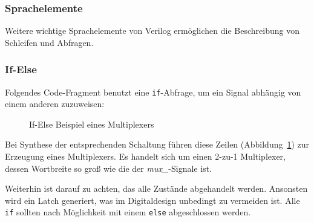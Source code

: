 \subsubsection{Sprachelemente}
Weitere wichtige Sprachelemente von Verilog ermöglichen die
Beschreibung von Schleifen und Abfragen.

\subsubsection*{If-Else}

Folgendes Code-Fragment benutzt eine \texttt{if}-Abfrage, um ein
Signal abhängig von einem anderen zuzuweisen:
\begin{figure}[H]
	\lstset{style=verilog-style}
	
	\caption{If-Else Beispiel eines Multiplexers} \label{bspmuxif}
\end{figure}


Bei Synthese der entsprechenden Schaltung führen diese Zeilen (Abbildung~\ref{bspmuxif}) zur
Erzeugung eines Multiplexers. Es handelt sich um einen 2-zu-1 Multiplexer, dessen Wortbreite so groß wie die der {\em
mux\_}-Signale ist.  

Weiterhin ist darauf zu achten, das alle Zustände abgehandelt werden. Ansonsten wird ein Latch generiert, was im Digitaldesign unbedingt zu vermeiden ist. Alle \texttt{if} sollten nach Möglichkeit mit einem \texttt{else} abgeschlossen werden. 

